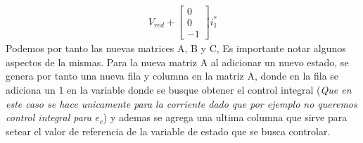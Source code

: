 \documentclass[
  11pt,
  letterpaper,
   addpoints,
   answers
  ]{exam}
\begin{document}
\begin{questions}
\begin{solution}
\begin{align}
            V_{red}
            +
            \begin{bmatrix}
                0\\
                0\\
                -1
            \end{bmatrix}
            i^{*}_{1}
        \end{align}
        Podemos por tanto las nuevas matrices A, B y C, Es importante notar algunos aspectos de la mismas. Para la nueva matriz A al adicionar un nuevo estado, se genera por tanto una nueva fila y columna en la matriz A, donde en la fila se adiciona un 1 en la variable donde se busque obtener el control integral (\textit{Que en este caso se hace unicamente para la corriente dado que por ejemplo no queremos control integral para $e_{c}$}) y ademas se agrega una ultima columna que sirve para setear el valor de referencia de la variable de estado que se busca controlar.


\end{solution}
\end{questions}
\end{document}

